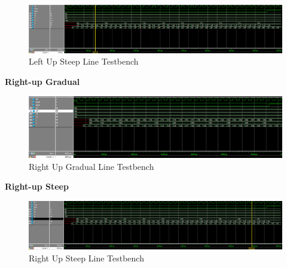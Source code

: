 \documentclass[11pt, titlepage]{article}
\begin{document}
\begin{description}
                    \begin{figure}[H]
                        \centering
                        \includegraphics[scale = 0.5]{Images/left-up steep line testbench.png}
                        \caption{Left Up Steep Line Testbench}
                    \end{figure}
                \item \textbf{Right-up Gradual} \\
                    \begin{figure}[H]
                        \centering
                        \includegraphics[scale = 0.55]{Images/right-up gradual line testbench.png}
                        \caption{Right Up Gradual Line Testbench}
                    \end{figure}
                \item \textbf{Right-up Steep} \\
                    \begin{figure}[H]
                        \centering
                        \includegraphics[scale = 0.5]{Images/right-up steep line testbench.png}
                        \caption{Right Up Steep Line Testbench}
                    \end{figure}


\end{description}
\end{document}

